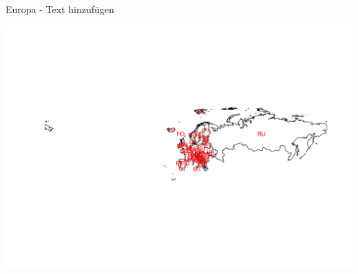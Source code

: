 \documentclass[ignorenonframetext,]{beamer}
\newenvironment{Shaded}{\begin{snugshade}}{\end{snugshade}}
\newcommand{\DataTypeTok}[1]{\textcolor[rgb]{0.74,0.68,0.62}{\underline{#1}}}
\newcommand{\KeywordTok}[1]{\textcolor[rgb]{0.26,0.66,0.93}{\textbf{#1}}}
\newcommand{\NormalTok}[1]{\textcolor[rgb]{0.74,0.68,0.62}{#1}}
\newcommand{\OperatorTok}[1]{\textcolor[rgb]{0.74,0.68,0.62}{#1}}
\newcommand{\StringTok}[1]{\textcolor[rgb]{0.02,0.61,0.04}{#1}}
\begin{document}
\begin{frame}[fragile]{Europa - Text hinzufügen}
\protect\hypertarget{europa---text-hinzufugen}{}

\begin{Shaded}
\end{Shaded}

\includegraphics{Geomedizin_files/figure-beamer/unnamed-chunk-86-1.pdf}

\end{frame}
\end{document}
